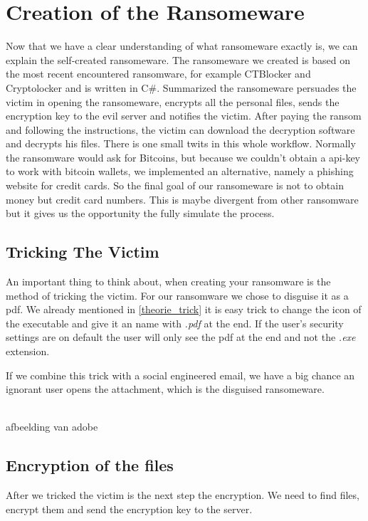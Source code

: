 \chapter{Creation of the Ransomeware}\label{Creation of the Ransomeware}

Now that we have a clear understanding of  what ransomeware exactly is, we can explain the self-created ransomeware. The ransomeware we created is based on the most recent encountered ransomware, for example CTBlocker and Cryptolocker and is written in C#. Summarized the ransomeware persuades the victim in opening the ransomeware, encrypts all the personal files, sends the encryption key to the evil server and notifies the victim. After paying the ransom and following the instructions, the victim can download the decryption software and decrypts his files. There is one small twits in this whole workflow. Normally the ransomware would ask for Bitcoins, but because we couldn't obtain a api-key to work with bitcoin wallets, we implemented an alternative, namely a phishing website for credit cards. So the final goal of our ransomeware is not to obtain money but credit card numbers. This is maybe divergent from other ransomware but it gives us the opportunity the fully simulate the process.



\section{Tricking The Victim}

An important thing to think about, when creating your ransomware is the method of tricking the victim. For our ransomware we chose to disguise it as a pdf. We already mentioned in \ref{theorie_trick} it is easy trick to change the icon of the executable and give it an name with \textit{.pdf} at the end. If the user's security settings are on default the user will only see the pdf at the end and not the \textit{.exe} extension.

If we combine this trick with a social engineered email, we have a big chance an ignorant user opens the attachment, which is the disguised ransomeware.

\\afbeelding van adobe

\section{Encryption of the files}

After we tricked the victim is the next step the encryption. We need to find files, encrypt them and send the encryption key to the server.

